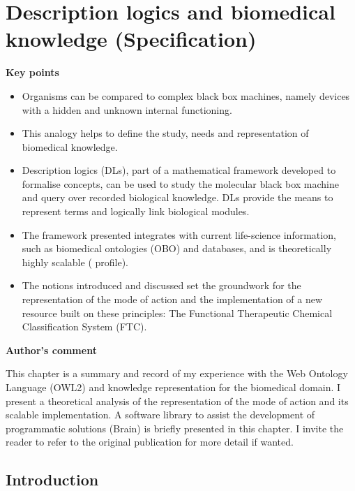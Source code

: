 \chapter{Description logics and biomedical knowledge (Specification)}

\textbf{Key points}
\begin{itemize}
  \item Organisms can be compared to complex black box machines, namely devices with a hidden and unknown internal functioning.
  \item This analogy helps to define the study, needs and representation of biomedical knowledge.
  \item Description logics (DLs), part of a mathematical framework developed to formalise concepts, can be used to study the molecular black box machine and query over recorded biological knowledge. DLs provide the means to represent terms and logically link biological modules.
  \item The framework presented integrates with current life-science information, such as biomedical ontologies (OBO) and databases, and is theoretically highly scalable ( profile).
  \item The notions introduced and discussed set the groundwork for the representation of the mode of action and the implementation of a new resource built on these principles: The Functional Therapeutic Chemical Classification System (FTC).
\end{itemize}

\textbf{Author’s comment}

This chapter is a summary and record of my experience with the Web Ontology Language (OWL2) and knowledge representation for the biomedical domain. I present a theoretical analysis of the representation of the mode of action and its scalable implementation. A software library to assist the development of programmatic solutions (Brain) is briefly presented in this chapter. I invite the reader to refer to the original publication \citep{croset2013brain} for more detail if wanted.

\hrulefill

\section{Introduction}

